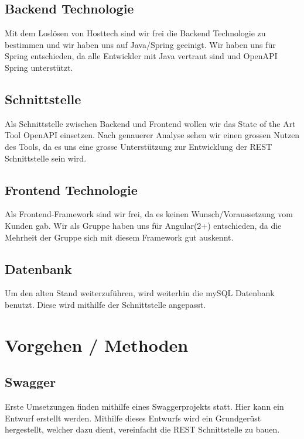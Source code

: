 \documentclass[a4paper]{article}
\begin{document}
	\subsection{Backend Technologie}
	Mit dem Loslösen von Hosttech sind wir frei die Backend Technologie zu bestimmen und wir haben uns auf Java/Spring geeinigt. Wir haben uns für Spring entschieden, da alle Entwickler mit Java vertraut sind und OpenAPI Spring unterstützt. 
	
	\subsection{Schnittstelle}
	Als Schnittstelle zwischen Backend und Frontend wollen wir das State of the Art Tool OpenAPI einsetzen. Nach genauerer Analyse sehen wir einen grossen Nutzen des Tools, da es uns eine grosse Unterstützung zur Entwicklung der REST Schnittstelle sein wird. 
	
	\subsection{Frontend Technologie}
	Als Frontend-Framework sind wir frei, da es keinen Wunsch/Voraussetzung vom Kunden gab.
	Wir als Gruppe haben uns für Angular(2+) entschieden, da die Mehrheit der Gruppe sich mit diesem Framework gut auskennt. 
	
	\subsection{Datenbank}
	Um den alten Stand weiterzuführen, wird weiterhin die mySQL Datenbank benutzt. Diese wird mithilfe der Schnittstelle angepasst.
	
	\section{Vorgehen / Methoden}
	
	\subsection{Swagger}
	Erste Umsetzungen finden mithilfe eines Swaggerprojekts statt. Hier kann ein Entwurf erstellt werden. Mithilfe dieses Entwurfs wird ein Grundgerüst hergestellt, welcher dazu dient, vereinfacht die REST Schnittstelle zu bauen.
\end{document}

